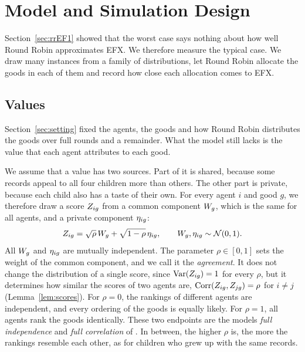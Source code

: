 \chapter{Model and Simulation Design}\label{ch:model}

Section~\ref{sec:rrEF1} showed that the worst case says nothing about how well Round Robin
approximates EFX. We therefore measure the typical case. We draw many instances from a family of
distributions, let Round Robin allocate the goods in each of them and record how close each
allocation comes to EFX.

\section{Values}\label{sec:instances}

Section~\ref{sec:setting} fixed the agents, the goods and how Round Robin distributes the goods over
full rounds and a remainder. What the model still lacks is the value that each agent attributes to
each good.

We assume that a value has two sources. Part of it is shared, because some records appeal to all four children more
than others. The other part is private, because each child also has a taste of their own. For every agent $i$ and good $g$, we therefore draw a score $Z_{ig}$ from a common component
$W_g$, which is the same for all agents, and a private component $\eta_{ig}$:
\[
  Z_{ig}=\sqrt{\rho}\,W_g+\sqrt{1-\rho}\,\eta_{ig},\qquad W_g,\eta_{ig}\sim\mathcal{N}(0,1).
\]
All $W_g$ and $\eta_{ig}$ are mutually independent. The parameter $\rho\in[0,1]$ sets the weight of the
common component, and we call it the \textit{agreement}. It does not change the distribution of a
single score, since $\operatorname{Var}(Z_{ig})=1$ for every $\rho$, but it determines how similar the scores of two
agents are, $\operatorname{Corr}(Z_{ig},Z_{jg})=\rho$ for $i\neq j$ (Lemma~\ref{lem:scores}). For $\rho=0$, the rankings of different agents
are independent, and every ordering of the goods is equally likely. For $\rho=1$, all agents rank
the goods identically. These two endpoints are the models \textit{full independence} and
\textit{full correlation} of \textcite[p.~74]{bouveret2011}. In between, the higher $\rho$ is, the more
the rankings resemble each other, as for children who grew up with the same records.

